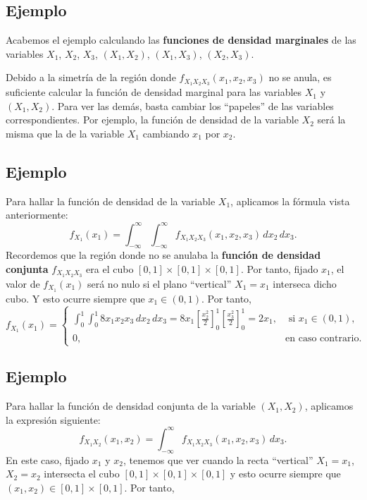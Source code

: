 \documentclass[]{book}
\begin{document}
\hypertarget{ejemplo-117}{%
\subsection{Ejemplo}\label{ejemplo-117}}

Acabemos el ejemplo calculando las \textbf{funciones de densidad marginales} de las variables \(X_1\), \(X_2\), \(X_3\), \((X_1,X_2)\), \((X_1,X_3)\), \((X_2,X_3)\).

Debido a la simetría de la región donde \(f_{X_1X_2X_3}(x_1,x_2,x_3)\) no se anula, es suficiente calcular la función de densidad marginal para las variables \(X_1\) y \((X_1,X_2)\). Para ver las demás, basta cambiar los ``papeles'' de las variables correspondientes. Por ejemplo, la función de densidad de la variable \(X_2\) será la misma que la de la variable \(X_1\) cambiando \(x_1\) por \(x_2\).

\hypertarget{ejemplo-118}{%
\subsection{Ejemplo}\label{ejemplo-118}}

Para hallar la función de densidad de la variable \(X_1\), aplicamos la fórmula vista anteriormente:
\[
f_{X_1}(x_1)=\int_{-\infty}^\infty\int_{-\infty}^\infty  f_{X_1X_2X_3}(x_1,x_2,x_3)\, dx_2\, dx_3.
\]
Recordemos que la región donde no se anulaba la \textbf{función de densidad conjunta} \(f_{X_1X_2X_3}\) era el cubo \([0,1]\times [0,1]\times [0,1]\). Por tanto, fijado \(x_1\), el valor de \(f_{X_1}(x_1)\) será no nulo si el plano ``vertical'' \(X_1=x_1\) interseca dicho cubo. Y esto ocurre siempre que \(x_1\in (0,1)\). Por tanto,
\[
f_{X_1}(x_1)=\begin{cases}
\int_{0}^1\int_0^1 8 x_1x_2 x_3  \, dx_2\, dx_3=8x_1\left[\frac{x_2^2}{2}\right]_0^1 \left[\frac{x_3^2}{2}\right]_0^1 =2 x_1, & \mbox{ si }x_1\in (0,1),\\
0, & \mbox{en caso contrario.}
\end{cases}
\]

\hypertarget{ejemplo-119}{%
\subsection{Ejemplo}\label{ejemplo-119}}

Para hallar la función de densidad conjunta de la variable \((X_1,X_2)\), aplicamos la expresión siguiente:
\[
f_{X_1X_2}(x_1,x_2)=\int_{-\infty}^\infty  f_{X_1X_2X_3}(x_1,x_2,x_3)\, dx_3.
\]
En este caso, fijado \(x_1\) y \(x_2\), tenemos que ver cuando la recta ``vertical'' \(X_1=x_1\), \(X_2=x_2\) intersecta el cubo \([0,1]\times [0,1]\times [0,1]\) y esto ocurre siempre que \((x_1,x_2)\in [0,1]\times [0,1]\).
Por tanto,
\end{document}
